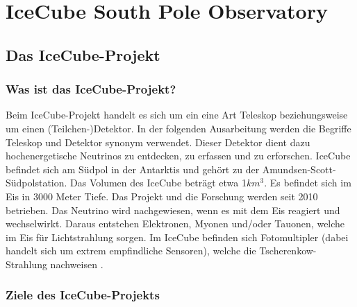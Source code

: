 \chapter{IceCube South Pole Observatory} 

    \vspace{8pt}

    \section{Das IceCube-Projekt}

    \subsection{Was ist das IceCube-Projekt?}

    Beim IceCube-Projekt handelt es sich um ein eine Art Teleskop beziehungsweise 
    um einen (Teilchen-)Detektor. In der folgenden Ausarbeitung werden die Begriffe 
    Teleskop und Detektor synonym verwendet. Dieser Detektor dient dazu hochenergetische 
    Neutrinos zu entdecken, zu erfassen und zu erforschen. IceCube befindet sich am 
    Südpol in der Antarktis und gehört zu der Amundsen-Scott-Südpolstation. 
    Das Volumen des IceCube beträgt etwa 1$km^3$. Es befindet sich im Eis in 3000 
    Meter Tiefe. Das Projekt und die Forschung werden seit 2010 betrieben. Das 
    Neutrino wird nachgewiesen, wenn es mit dem Eis reagiert und wechselwirkt. 
    Daraus entstehen Elektronen, Myonen und/oder Tauonen, welche im Eis für 
    Lichtstrahlung sorgen. Im IceCube befinden sich Fotomultipler (dabei handelt 
    sich um extrem empfindliche Sensoren), welche die Tscherenkow-Strahlung nachweisen \cite{FAQ13}.

    \subsection{Ziele des IceCube-Projekts}

